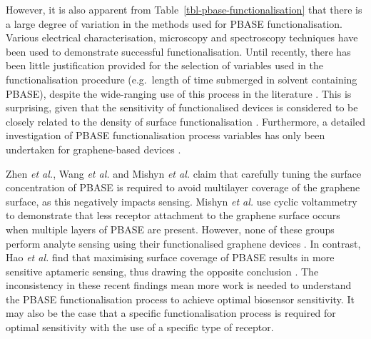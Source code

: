 \documentclass[
  a4paper,
]{scrbook}
\begin{document}
However, it is also apparent from
Table~\ref{tbl-pbase-functionalisation} that there is a large degree of
variation in the methods used for PBASE functionalisation. Various
electrical characterisation, microscopy and spectroscopy techniques have
been used to demonstrate successful functionalisation. Until recently,
there has been little justification provided for the selection of
variables used in the functionalisation procedure (e.g.~length of time
submerged in solvent containing PBASE), despite the wide-ranging use of
this process in the literature \autocite{Hinnemo2017,Zhen2018,Wang2020}.
This is surprising, given that the sensitivity of functionalised devices
is considered to be closely related to the density of surface
functionalisation \autocite{White2008,Hermanson2013-3,Chen2014}.
Furthermore, a detailed investigation of PBASE functionalisation process
variables has only been undertaken for graphene-based devices
\autocite{Zhen2018,Hao2020,Wang2020,Mishyn2022}.

Zhen \emph{et al.}, Wang \emph{et al.} and Mishyn \emph{et al.} claim
that carefully tuning the surface concentration of PBASE is required to
avoid multilayer coverage of the graphene surface, as this negatively
impacts sensing. Mishyn \emph{et al.} use cyclic voltammetry to
demonstrate that less receptor attachment to the graphene surface occurs
when multiple layers of PBASE are present. However, none of these groups
perform analyte sensing using their functionalised graphene devices
\autocite{Zhen2018,Wang2020,Mishyn2022}. In contrast, Hao \emph{et al.}
find that maximising surface coverage of PBASE results in more sensitive
aptameric sensing, thus drawing the opposite conclusion
\autocite{Hao2020}. The inconsistency in these recent findings mean more
work is needed to understand the PBASE functionalisation process to
achieve optimal biosensor sensitivity. It may also be the case that a
specific functionalisation process is required for optimal sensitivity
with the use of a specific type of receptor.
\end{document}
